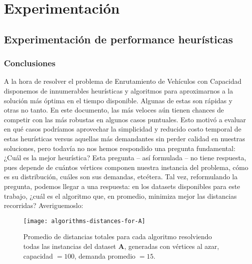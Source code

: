 \section{Experimentación}

\subsection{Experimentación de performance heurísticas}








\subsubsection{Conclusiones}
 A la hora de resolver el problema de Enrutamiento de Vehículos con Capacidad disponemos de innumerables heurísticas y algoritmos para aproximarnos a la solución más óptima en el tiempo disponible. Algunas de estas son rápidas y otras no tanto. En este documento, las más veloces aún tienen chances de competir con las más robustas en algunos casos puntuales. Esto motivó a evaluar en qué casos podríamos aprovechar la simplicidad y reducido costo temporal de estas heurísticas versus aquellas más demandantes sin perder calidad en nuestras soluciones, pero todavía no nos hemos respondido una pregunta fundamental: ¿Cuál es la mejor heurística? Esta pregunta – así formulada – no tiene respuesta, pues depende de cuántos vértices componen nuestra instancia del problema, cómo es su distribución, cuáles son sus demandas, etcétera. Tal vez, reformulando la pregunta, podemos llegar a una respuesta: en los datasets disponibles para este trabajo, ¿cuál es el algoritmo que, en promedio, minimiza mejor las distancias recorridas? Averiguemoslo:

 \begin{figure}[H]
 	\centering
	\texttt{[image: algorithms-distances-for-A]}
	\caption{\footnotesize Promedio de distancias totales para cada algoritmo resolviendo todas las instancias del dataset \textbf{A}, generadas con vértices al azar, capacidad $=100$, demanda promedio $=15$.}
	\label{fig:algorithms-distances-for-A}
 \end{figure}

